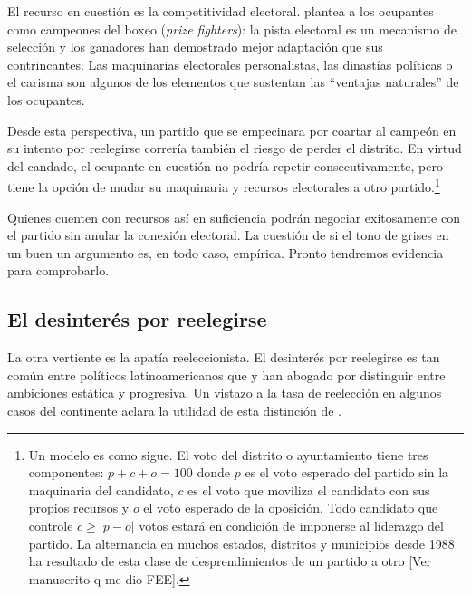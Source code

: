\documentclass[letter,12pt]{article}
\begin{document}
El recurso en cuestión es la competitividad electoral. \citet{zallerprizeFighters} plantea a los ocupantes como campeones del boxeo (\emph{prize fighters}): la pista electoral es un mecanismo de selección y los ganadores han demostrado mejor adaptación que sus contrincantes. Las maquinarias electorales personalistas, las dinastías políticas o el carisma son algunos de los elementos que sustentan las ``ventajas naturales'' de los ocupantes.

Desde esta perspectiva, un partido que se empecinara por coartar al campeón en su intento por reelegirse correría también el riesgo de perder el distrito. En virtud del candado, el ocupante en cuestión no podría repetir consecutivamente, pero tiene la opción de mudar su maquinaria y recursos electorales a otro partido.\footnote{Un modelo es como sigue. El voto del distrito o ayuntamiento tiene tres componentes: $p + c + o = 100$ donde $p$ es el voto esperado del partido sin la maquinaria del candidato, $c$ es el voto que moviliza el candidato con sus propios recursos y $o$ el voto esperado de la oposición. Todo candidato que controle $c \ge |p-o|$ votos estará en condición de imponerse al liderazgo del partido. La alternancia en muchos estados, distritos y municipios desde 1988 ha resultado de esta clase de desprendimientos de un partido a otro [Ver manuscrito q me dio FEE].}

Quienes cuenten con recursos así en suficiencia podrán negociar exitosamente con el partido sin anular la conexión electoral. La cuestión de si el tono de grises en un buen un argumento es, en todo caso, empírica. Pronto tendremos evidencia para comprobarlo. 

\subsection{El desinterés por reelegirse}

\noindent La otra vertiente es la apatía reeleccionista. El desinterés por reelegirse es tan común entre políticos latinoamericanos que \citet{morgenstern.2002b} y \citet{micozziPhD2009} han abogado por distinguir entre ambiciones estática y progresiva. Un vistazo a la tasa de reelección en algunos casos del continente aclara la utilidad de esta distinción de \citet{schlesinger.1966}.
\end{document}

